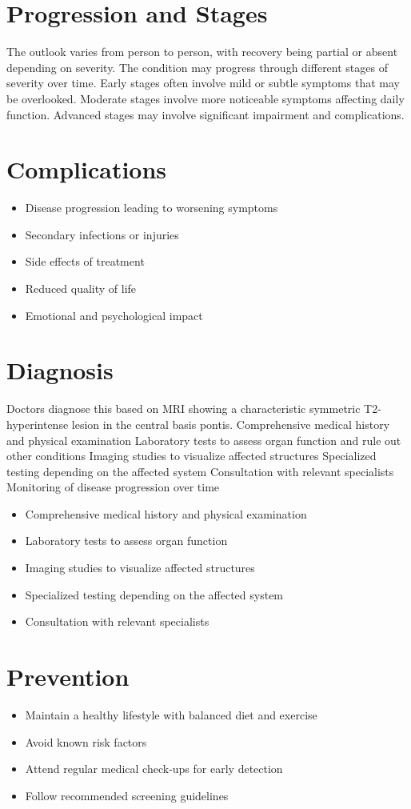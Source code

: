 \section{Progression and Stages}
The outlook varies from person to person, with recovery being partial or absent depending on severity. The condition may progress through different stages of severity over time. Early stages often involve mild or subtle symptoms that may be overlooked. Moderate stages involve more noticeable symptoms affecting daily function. Advanced stages may involve significant impairment and complications.
\section{Complications}
\begin{itemize}[noitemsep]
  \item Disease progression leading to worsening symptoms
  \item Secondary infections or injuries
  \item Side effects of treatment
  \item Reduced quality of life
  \item Emotional and psychological impact
\end{itemize}
\section{Diagnosis}
Doctors diagnose this based on MRI showing a characteristic symmetric T2-hyperintense lesion in the central basis pontis. Comprehensive medical history and physical examination Laboratory tests to assess organ function and rule out other conditions Imaging studies to visualize affected structures Specialized testing depending on the affected system Consultation with relevant specialists Monitoring of disease progression over time

\begin{itemize}[noitemsep]
  \item Comprehensive medical history and physical examination
  \item Laboratory tests to assess organ function
  \item Imaging studies to visualize affected structures
  \item Specialized testing depending on the affected system
  \item Consultation with relevant specialists
\end{itemize}
\section{Prevention}
\begin{itemize}[noitemsep]
  \item Maintain a healthy lifestyle with balanced diet and exercise
  \item Avoid known risk factors
  \item Attend regular medical check-ups for early detection
  \item Follow recommended screening guidelines
\end{itemize}
